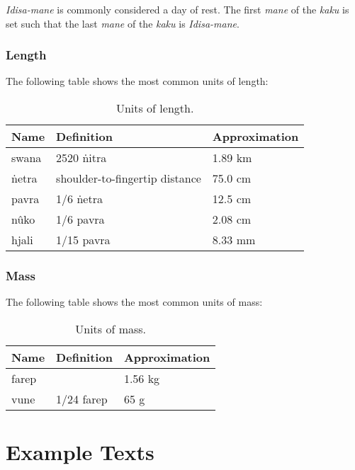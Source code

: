 \documentclass{book}
\begin{document}
\emph{Idisa-mane} is commonly considered a day of rest. The first \emph{mane} of the \emph{kaku} is set such that the last \emph{mane} of the \emph{kaku} is \emph{Idisa-mane}.

\newpage
\subsection{Length}

The following table shows the most common units of length:

\begin{table}[h]
    \caption{Units of length.}
    \centering
    \begin{tabu}{|l|X|X|}
        \hline
        Name & Definition & Approximation \\
        \hline
        swana & 2520 ṅitra & 1.89 km \\
        ṅetra & shoulder-to-fingertip distance & 75.0 cm \\
        pavra & 1/6 ṅetra & 12.5 cm \\
        nûko & 1/6 pavra & 2.08 cm \\
        hjali & 1/15 pavra & 8.33 mm \\
        \hline
    \end{tabu}
\end{table}

\subsection{Mass}

The following table shows the most common units of mass:

\begin{table}[h]
    \caption{Units of mass.}
    \centering
    \begin{tabu}{|l|X|X|}
        \hline
        Name & Definition & Approximation \\
        \hline
        farep & & 1.56 kg \\
        vune & 1/24 farep & 65 g \\
        \hline
    \end{tabu}
\end{table}


\chapter{Example Texts}
\end{document}
